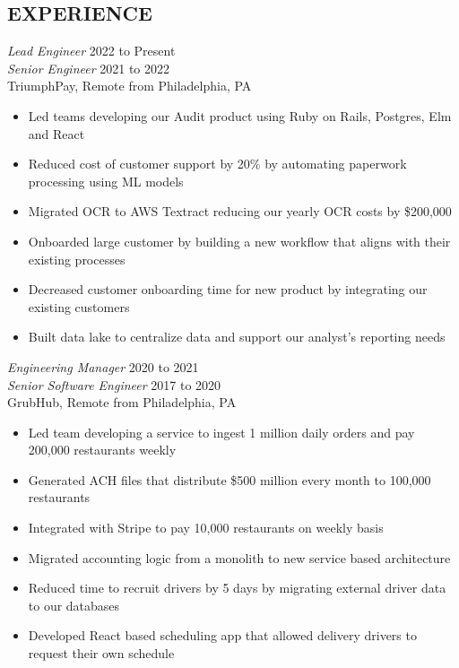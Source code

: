 \documentclass[line]{style}
\begin{document}
\newsectionwidth{0in}

\address{michaelcdalton@gmail.com}
\address{linkedin.com/in/michaelcdalton}

\begin{resume}

\section{EXPERIENCE}

{\sl Lead Engineer} \hfill 2022 to Present \\
{\sl Senior Engineer} \hfill 2021 to 2022 \\
TriumphPay, Remote from Philadelphia, PA
\begin{itemize} \itemsep -2pt
\item Led teams developing our Audit product using Ruby on Rails, Postgres, Elm and React
\item Reduced cost of customer support by 20\% by automating paperwork processing using ML models
\item Migrated OCR to AWS Textract reducing our yearly OCR costs by \$200,000
\item Onboarded large customer by building a new workflow that aligns with their existing processes
\item Decreased customer onboarding time for new product by integrating our existing customers
\item Built data lake to centralize data and support our analyst's reporting needs
\end{itemize}

{\sl Engineering Manager} \hfill 2020 to 2021 \\
{\sl Senior Software Engineer} \hfill 2017 to 2020 \\
GrubHub, Remote from Philadelphia, PA
\begin{itemize} \itemsep -2pt
\item Led team developing a service to ingest 1 million daily orders and pay 200,000 restaurants weekly
\item Generated ACH files that distribute \$500 million every month to 100,000 restaurants
\item Integrated with Stripe to pay 10,000 restaurants on weekly basis
\item Migrated accounting logic from a monolith to new service based architecture
\item Reduced time to recruit drivers by 5 days by migrating external driver data to our databases
\item Developed React based scheduling app that allowed delivery drivers to request their own schedule
\end{itemize}


\end{resume}
\end{document}
